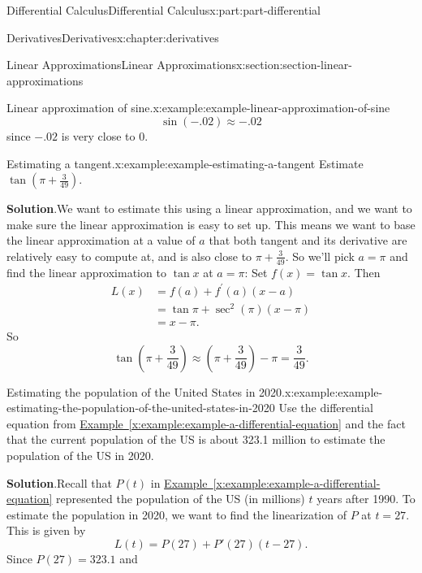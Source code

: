 \documentclass[twoside,10pt,]{tufte-book}
\newcommand{\blocktitlefont}{\relax}
\newcommand{\xreffont}{\relax}
\numberwithin{equation}{part}
\begin{document}
\begin{partptx}{Differential Calculus}{}{Differential Calculus}{}{}{x:part:part-differential}
\begin{chapterptx}{Derivatives}{}{Derivatives}{}{}{x:chapter:derivatives}
\begin{sectionptx}{Linear Approximations}{}{Linear Approximations}{}{}{x:section:section-linear-approximations}
\begin{example}{Linear approximation of sine.}{x:example:example-linear-approximation-of-sine}
\begin{equation*}
\sin(-.02)\approx-.02
\end{equation*}
since \(-.02\) is very close to \(0\).%
\end{example}
\begin{example}{Estimating a tangent.}{x:example:example-estimating-a-tangent}%
Estimate \(\tan(\pi+\frac{3}{49})\).%
\par\smallskip%
\noindent\textbf{\blocktitlefont Solution}.\hypertarget{g:solution:idm35150998642496}{}\quad{}We want to estimate this using a linear approximation, and we want to make sure the linear approximation is easy to set up. This means we want to base the linear approximation at a value of \(a\) that both tangent and its derivative are relatively easy to compute at, and is also close to \(\pi+\frac{3}{49}\). So we'll pick \(a=\pi\) and find the linear approximation to \(\tan x\) at \(a = \pi\): Set \(f(x) = \tan x\). Then%
\begin{align*}
L(x) & = f(a) + f^\prime(a)(x-a)\\
& = \tan\pi + \sec^{2}(\pi)(x-\pi) \\
& = x-\pi. 
\end{align*}
So%
\begin{equation*}
\tan(\pi+\frac{3}{49}) \approx (\pi+\frac{3}{49}) - \pi = \frac{3}{49}.
\end{equation*}
%
\end{example}
\begin{example}{Estimating the population of the United States in 2020.}{x:example:example-estimating-the-population-of-the-united-states-in-2020}%
Use the differential equation from \hyperref[x:example:example-a-differential-equation]{Example~{\xreffont\ref{x:example:example-a-differential-equation}}} and the fact that the current population of the US is about 323.1 million to estimate the population of the US in 2020.%
\par\smallskip%
\noindent\textbf{\blocktitlefont Solution}.\hypertarget{g:solution:idm35150998636864}{}\quad{}Recall that \(P(t)\) in \hyperref[x:example:example-a-differential-equation]{Example~{\xreffont\ref{x:example:example-a-differential-equation}}} represented the population of the US (in millions) \(t\) years after 1990. To estimate the population in 2020, we want to find the linearization of \(P\) at \(t = 27\). This is given by%
\begin{equation*}
L(t) = P(27) + P'(27)(t - 27).
\end{equation*}
Since \(P(27) = 323.1\) and%
\begin{equation*}

\end{equation*}
\end{example}
\end{sectionptx}
\end{chapterptx}
\end{partptx}
\end{document}
